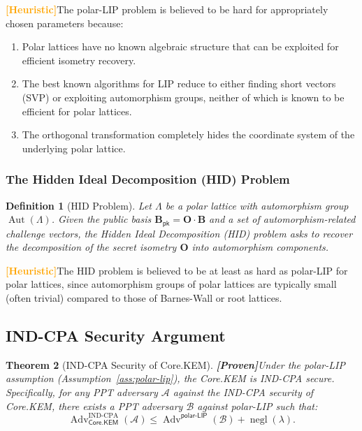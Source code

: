 \documentclass[11pt,a4paper]{article}
\newtheorem{theorem}{Theorem}[section]
\newtheorem{definition}[theorem]{Definition}
\newcommand{\CoreKEM}{\textsf{Core.KEM}\xspace}
\newcommand{\lipPrb}{\textsf{LIP}\xspace}
\newcommand{\polarLIP}{\textsf{polar-LIP}\xspace}
\newcommand{\hidPrbl}{\textsf{HID}\xspace}
\newcommand{\INDCPA}{\textsf{IND-CPA}\xspace}
\DeclareMathOperator{\negl}{negl}
\DeclareMathOperator{\Adv}{Adv}
\DeclareMathOperator{\Aut}{Aut}
\newcommand{\pk}{\mathsf{pk}}
\newcommand{\heuTag}{\textcolor{orange}{\textbf{[Heuristic]}}}
\newcommand{\prv}{\textcolor{green!60!black}{\textbf{[Proven]}}}
\begin{document}
\heuTag The \polarLIP problem is believed to be hard for appropriately chosen parameters because:
\begin{enumerate}[leftmargin=2em]
\item Polar lattices have no known algebraic structure that can be exploited for efficient isometry recovery.
\item The best known algorithms for \lipPrb reduce to either finding short vectors (SVP) or exploiting automorphism groups, neither of which is known to be efficient for polar lattices.
\item The orthogonal transformation completely hides the coordinate system of the underlying polar lattice.
\end{enumerate}

\subsubsection{The Hidden Ideal Decomposition (HID) Problem}

\begin{definition}[\hidPrbl Problem]\label{def:hid}
Let $\Lambda$ be a polar lattice with automorphism group $\Aut(\Lambda)$. Given the public basis $\mathbf{B}_{\pk} = \mathbf{O} \cdot \mathbf{B}$ and a set of automorphism-related challenge vectors, the \emph{Hidden Ideal Decomposition (\hidPrbl)} problem asks to recover the decomposition of the secret isometry $\mathbf{O}$ into automorphism components.
\end{definition}

\heuTag The \hidPrbl problem is believed to be at least as hard as \polarLIP for polar lattices, since automorphism groups of polar lattices are typically small (often trivial) compared to those of Barnes-Wall or root lattices.

\subsection{IND-CPA Security Argument}\label{sec:indcpa-proof}

\begin{theorem}[IND-CPA Security of \CoreKEM]\label{thm:indcpa}
\prv Under the \polarLIP assumption (Assumption~\ref{ass:polar-lip}), the \CoreKEM is \INDCPA secure. Specifically, for any PPT adversary $\mathcal{A}$ against the \INDCPA security of \CoreKEM, there exists a PPT adversary $\mathcal{B}$ against \polarLIP such that:
\[
\Adv_{\CoreKEM}^{\text{IND-CPA}}(\mathcal{A}) \leq \Adv^{\polarLIP}(\mathcal{B}) + \negl(\lambda).
\]
\end{theorem}
\end{document}
